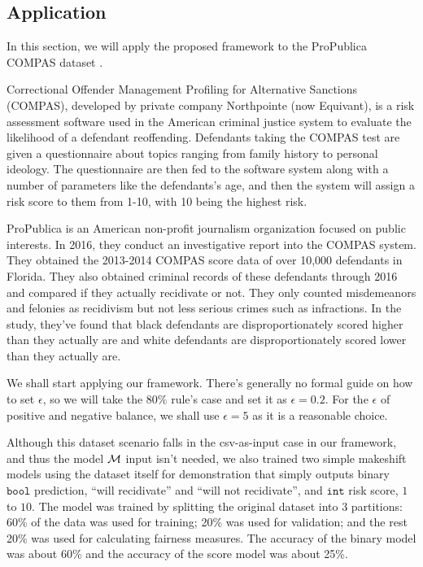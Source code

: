 \documentclass[conference]{IEEEtran}
\begin{document}

\subsection{Application}
\label{sec:app}
In this section, we will apply the proposed framework to the ProPublica COMPAS dataset \cite{angwin2016machine,larson2016compas,larson2016propublica}.

Correctional Offender Management Profiling for Alternative Sanctions (COMPAS), developed by private company Northpointe (now Equivant), is a risk assessment software used in the American criminal justice system to evaluate the likelihood of a defendant reoffending. Defendants taking the COMPAS test are given a questionnaire about topics ranging from family history to personal ideology. The questionnaire are then fed to the software system along with a number of parameters like the defendants's age, and then the system will assign a risk score to them from 1-10, with 10 being the highest risk.

ProPublica is an American non-profit journalism organization focused on public interests. In 2016, they conduct an investigative report into the COMPAS system. They obtained the 2013-2014 COMPAS score data of over 10,000 defendants in Florida. They also obtained criminal records of these defendants through 2016 and compared if they actually recidivate or not. They only counted misdemeanors and felonies as recidivism but not less serious crimes such as infractions. In the study, they've found that black defendants are disproportionately scored higher than they actually are and white defendants are disproportionately scored lower than they actually are.

We shall start applying our framework. There's generally no formal guide on how to set $\epsilon$, so we will take the 80\% rule's case and set it as $\epsilon = 0.2$. For the $\epsilon$ of positive and negative balance, we shall use $\epsilon = 5$ as it is a reasonable choice.

Although this dataset scenario falls in the csv-as-input case in our framework, and thus the model $\mathcal{M}$ input isn't needed, we also trained two simple makeshift models using the dataset itself for demonstration that simply outputs binary $\mathtt{bool}$ prediction, ``will recidivate'' and ``will not recidivate'', and $\mathtt{int}$ risk score, $1$ to $10$. The model was trained by splitting the original dataset into 3 partitions: 60\% of the data was used for training; 20\% was used for validation; and the rest 20\% was used for calculating fairness measures. The accuracy of the binary model was about 60\% and the accuracy of the score model was about 25\%.
\end{document}
